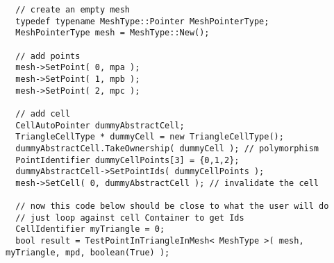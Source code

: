 \documentclass{InsightArticle}
\begin{document}
\begin{verbatim}
  // create an empty mesh
  typedef typename MeshType::Pointer MeshPointerType;
  MeshPointerType mesh = MeshType::New();

  // add points
  mesh->SetPoint( 0, mpa );
  mesh->SetPoint( 1, mpb );
  mesh->SetPoint( 2, mpc );

  // add cell
  CellAutoPointer dummyAbstractCell;
  TriangleCellType * dummyCell = new TriangleCellType();
  dummyAbstractCell.TakeOwnership( dummyCell ); // polymorphism
  PointIdentifier dummyCellPoints[3] = {0,1,2};
  dummyAbstractCell->SetPointIds( dummyCellPoints );
  mesh->SetCell( 0, dummyAbstractCell ); // invalidate the cell

  // now this code below should be close to what the user will do
  // just loop against cell Container to get Ids
  CellIdentifier myTriangle = 0;
  bool result = TestPointInTriangleInMesh< MeshType >( mesh, myTriangle, mpd, boolean(True) );
\end{verbatim}



\end{document}
